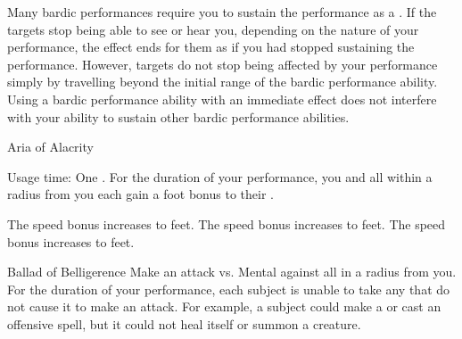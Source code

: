         Many bardic performances require you to sustain the performance as a .
        If the targets stop being able to see or hear you, depending on the nature of your performance, the effect ends for them as if you had stopped sustaining the performance.
        However, targets do not stop being affected by your performance simply by travelling beyond the initial range of the bardic performance ability.
        Using a bardic performance ability with an immediate effect does not interfere with your ability to sustain other bardic performance abilities.
        {
            \begin{durationability}{Aria of Alacrity}
                \par \noindent Usage time: One .
                \rankline
                For the duration of your performance, you and all  within a \arealarge radius from you each gain a  foot bonus to their .

                \rankline
                 The speed bonus increases to  feet.
                 The speed bonus increases to  feet.
                 The speed bonus increases to  feet.
            \end{durationability}

            \begin{durationability}{Ballad of Belligerence}
                \rankline
                Make an attack vs. Mental against all  in a \areamed radius from you.
                \hit For the duration of your performance, each subject is unable to take any  that do not cause it to make an attack.
                For example, a subject could make a  or cast an offensive spell, but it could not heal itself or summon a creature.


\end{durationability}}
